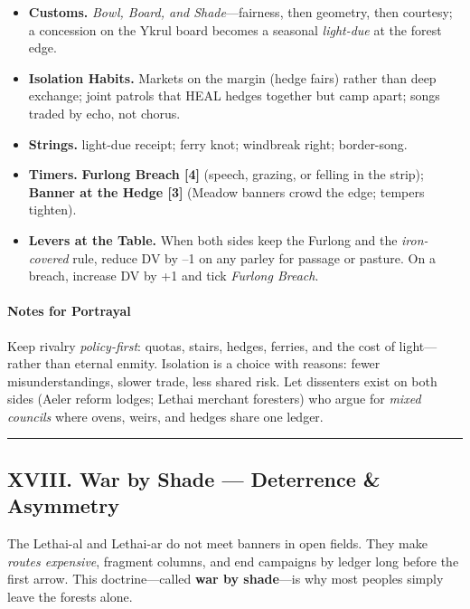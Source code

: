 \documentclass[11pt]{article}
\begin{document}
\begin{itemize}[leftmargin=*]
  \item \textbf{Customs.} \emph{Bowl, Board, and Shade}---fairness, then geometry, then courtesy; a concession on the Ykrul board becomes a seasonal \emph{light-due} at the forest edge.
  \item \textbf{Isolation Habits.} Markets on the margin (hedge fairs) rather than deep exchange; joint patrols that HEAL hedges together but camp apart; songs traded by echo, not chorus.
  \item \textbf{Strings.} light-due receipt; ferry knot; windbreak right; border-song.
  \item \textbf{Timers.} \textbf{Furlong Breach [4]} (speech, grazing, or felling in the strip); \textbf{Banner at the Hedge [3]} (Meadow banners crowd the edge; tempers tighten).
  \item \textbf{Levers at the Table.} When both sides keep the Furlong and the \emph{iron-covered} rule, reduce DV by --1 on any parley for passage or pasture. On a breach, increase DV by +1 and tick \emph{Furlong Breach}.
\end{itemize}

\paragraph{Notes for Portrayal}
Keep rivalry \emph{policy-first}: quotas, stairs, hedges, ferries, and the cost of light---rather than eternal enmity. Isolation is a choice with reasons: fewer misunderstandings, slower trade, less shared risk. Let dissenters exist on both sides (Aeler reform lodges; Lethai merchant foresters) who argue for \emph{mixed councils} where ovens, weirs, and hedges share one ledger.

\medskip\hrule\medskip

\subsection{XVIII. War by Shade --- Deterrence \& Asymmetry}

The Lethai-al and Lethai-ar do not meet banners in open fields. They make \emph{routes expensive}, fragment columns, and end campaigns by ledger long before the first arrow. This doctrine---called \textbf{war by shade}---is why most peoples simply leave the forests alone.
\end{document}

